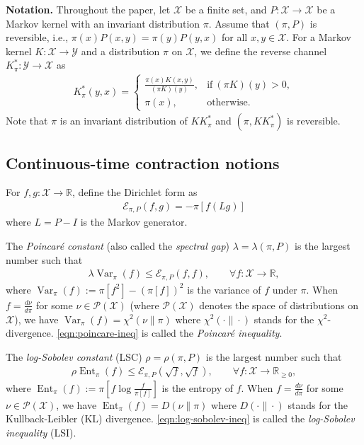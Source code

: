 \documentclass[11pt]{article}
\def\bR{\mathbb{R}}
\def\cE{\mathcal{E}}
\def\cP{\mathcal{P}}
\def\cX{\mathcal{X}}
\def\cY{\mathcal{Y}}
\DeclareMathOperator\Var{\mathrm{Var}}
\DeclareMathOperator\Ent{\mathrm{Ent}}
\theoremstyle{definition}
\begin{document}
\medskip
\textbf{Notation.}
Throughout the paper, let $\cX$ be a finite set, and $P: \cX \to \cX$ be a Markov kernel with an
invariant distribution $\pi$. Assume that $(\pi, P)$ is reversible, i.e., $\pi(x)P(x,y) = \pi(y)
P(y,x)$ for all $x,y\in \cX$.
For a Markov kernel $K: \cX \to \cY$ and a distribution $\pi$ on $\cX$, we define the reverse channel $K_\pi^*: \cY\to \cX$ as
\begin{align}
  K_\pi^*(y,x) = \left\{
    \begin{array}{ll}
      \frac{\pi(x) K(x,y)}{(\pi K)(y)}, & \text{if}~(\pi K)(y)>0,\\
      \pi(x), & \text{otherwise.}
    \end{array}
  \right.
\end{align}
Note that $\pi$ is an invariant distribution of $KK_\pi^*$ and $(\pi,KK_\pi^*)$ is reversible.


\subsection{Continuous-time contraction notions} \label{sec:intro:continuous}


For $f,g: \cX \to \bR$, define the Dirichlet form as
\begin{align}
  \cE_{\pi,P}(f, g) = -\pi[f (L g)]
\end{align}
where $L=P-I$ is the Markov generator.

The \emph{Poincar\'e constant} (also called the \emph{spectral gap}) $\lambda=\lambda(\pi, P)$ is the largest number such that
\begin{align} \label{eqn:poincare-ineq}
  \lambda \Var_\pi(f) \le \cE_{\pi,P}(f,f), \qquad \forall f: \cX \to \bR,
\end{align}
where $\Var_\pi(f) := \pi[f^2] - (\pi[f])^2$ is the variance of $f$ under $\pi$.
When $f = \frac{d\nu}{d\pi}$ for some $\nu\in \cP(\cX)$ (where $\cP(\cX)$ denotes the space of distributions on $\cX$), we have
$\Var_\pi(f) = \chi^2(\nu \| \pi)$ where $\chi^2(\cdot \| \cdot)$ stands for the $\chi^2$-divergence.
\cref{eqn:poincare-ineq} is called the \emph{Poincar\'e inequality}.

The \emph{log-Sobolev constant} (LSC) $\rho=\rho(\pi, P)$ is the largest number such that
\begin{align} \label{eqn:log-sobolev-ineq}
  \rho \Ent_\pi(f) \le \cE_{\pi,P}(\sqrt f, \sqrt f), \qquad \forall f: \cX \to \bR_{\ge 0},
\end{align}
where $\Ent_\pi(f) := \pi\left[f\log \frac{f}{\pi[f]}\right]$ is the entropy of $f$.
When $f = \frac{d\nu}{d\pi}$ for some $\nu\in \cP(\cX)$, we have $\Ent_\pi(f) = D(\nu \| \pi)$ where $D(\cdot \| \cdot)$ stands for the Kullback-Leibler (KL) divergence.
\cref{eqn:log-sobolev-ineq} is called the \emph{log-Sobolev inequality} (LSI).
\end{document}
